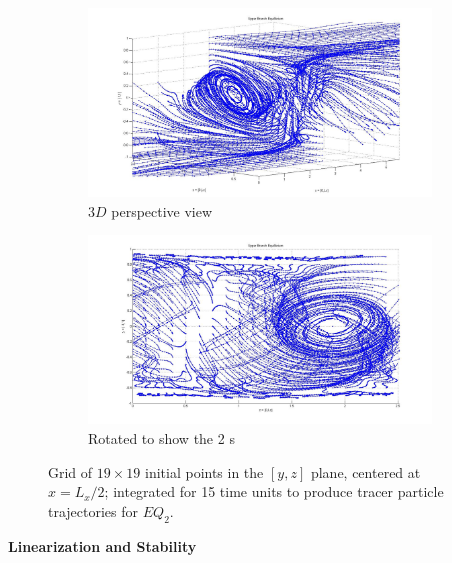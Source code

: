 \documentclass[letter,12pt,openany]{article}
\begin{document}
\begin{figure}[!h]
\centering
    \begin{subfigure}{0.98\textwidth}
    \includegraphics[width=1.0\textwidth]{fig_UB1.jpg}
      \caption{
        $3D$ perspective view
       }
      \label{eltonFig:UBs_a}
    \end{subfigure}

    \begin{subfigure}{0.98\textwidth}
    \includegraphics[width=1.0\textwidth]{fig_UB1eq.jpg}
      \caption{
        Rotated to show the 2 \stagp s
       }
      \label{eltonFig:UBs_b}
    \end{subfigure}
    \caption{Grid of $19 \times 19$  initial points in the $[y,z]$ plane,
centered at $x = L_x/2$; integrated for 15 time units to produce tracer particle trajectories for $EQ_2$.}
\label{eltonFig:UBs}
 \end{figure}






\noindent \textbf{Linearization and Stability} \\
\end{document}
